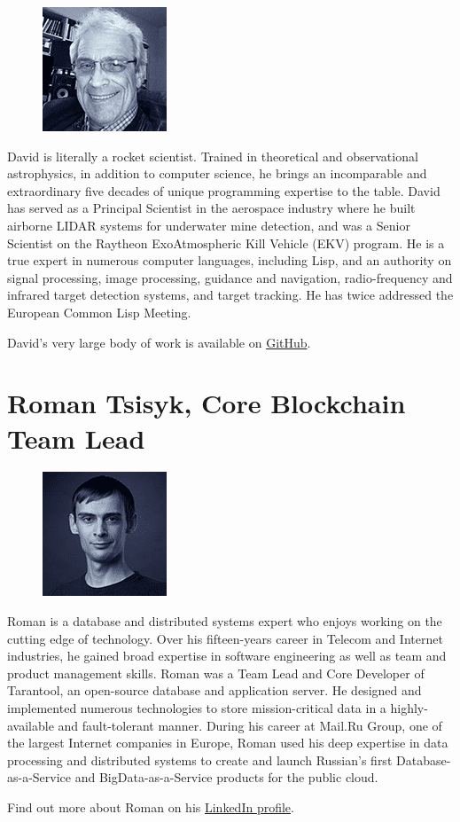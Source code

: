 \documentclass[8pt,fleqn,openany]{book}
\begin{document}
{
\setlength\intextsep{0pt}
\begin{figure}
	\includegraphics{images/team/team-3.png}
\end{figure}

David is literally a rocket scientist. Trained in theoretical and observational astrophysics, in addition to computer science, he brings an incomparable and extraordinary five decades of unique programming expertise to the table. David has served as a Principal Scientist in the aerospace industry where he built airborne LIDAR systems for underwater mine detection, and was a Senior Scientist on the Raytheon ExoAtmospheric Kill Vehicle (EKV) program. He is a true expert in numerous computer languages, including Lisp, and an authority on signal processing, image processing, guidance and navigation, radio-frequency and infrared target detection systems, and target tracking. He has twice addressed the European Common Lisp Meeting. 

David's very large body of work is available on \href{https://github.com/dbmcclain}{GitHub}.
}

\section{Roman Tsisyk, Core Blockchain Team Lead}

{
\setlength\intextsep{0pt}
\begin{figure}
	\includegraphics{images/team/team-4.png}
\end{figure}

Roman is a database and distributed systems expert who enjoys working on the cutting edge of technology. Over his fifteen-years career in Telecom and Internet industries, he gained broad expertise in software engineering as well as team and product management skills. Roman was a Team Lead and Core Developer of Tarantool, an open-source database and application server. He designed and implemented numerous technologies to store mission-critical data in a highly-available and fault-tolerant manner. During his career at Mail.Ru Group, one of the largest Internet companies in Europe, Roman used his deep expertise in data processing and distributed systems to create and launch Russian’s first Database-as-a-Service and BigData-as-a-Service products for the public cloud. 

Find out more about Roman on his \href{https://linkedin.com/in/roman.tsisyk}{LinkedIn profile}.
}
\end{document}
